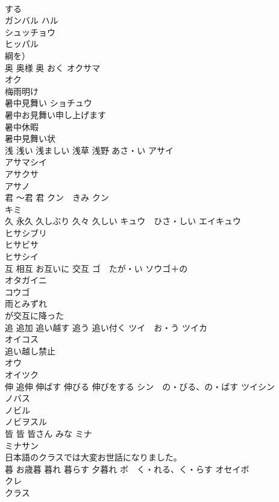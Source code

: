 \documentclass[8pt]{extreport}
\begin{document}
\begin{CJK}{UTF8}{min}
\\	する 
\\	ガンバル ハル 
\\	シュッチョウ 
\\	ヒッパル 
\\	綱を）
\\	奥 奥様 奥	おく オクサマ 
\\	オク　
\\	梅雨明け	
\\	暑中見舞い	ショチュウ 
\\	暑中お見舞い申し上げます 
\\	暑中休暇 
\\	暑中見舞い状 
\\	浅 浅い 浅ましい 浅草 浅野	あさ・い アサイ　
\\	アサマシイ 
\\	アサクサ 
\\	アサノ 
\\	君 〜君 君	クン　きみ クン 
\\	キミ 
\\	久 永久 久しぶり 久々 久しい	キュウ　ひさ・しい エイキュウ 
\\	ヒサシブリ 
\\	ヒサビサ 
\\	ヒサシイ 
\\	互 相互 お互いに 交互	ゴ　たが・い ソウゴ＋の
\\	オタガイニ 
\\	コウゴ 
\\	雨とみずれ
\\	が交互に降った
\\	追 追加 追い越す 追う 追い付く	ツイ　お・う ツイカ 
\\	オイコス 
\\	追い越し禁止 
\\	オウ　
\\	オイツク 
\\	伸 追伸 伸ばす 伸びる 伸びをする	シン　の・びる、の・ばす ツイシン 
\\	ノバス
\\	ノビル
\\	ノビヲスル 
\\	皆 皆 皆さん	みな ミナ 
\\	ミナサン 
\\	日本語のクラスでは大変お世話になりました。	
\\	暮 お歳暮 暮れ 暮らす 夕暮れ	ボ　く・れる、く・らす オセイボ
\\	クレ
\\	クラス

\end{CJK}
\end{document}
